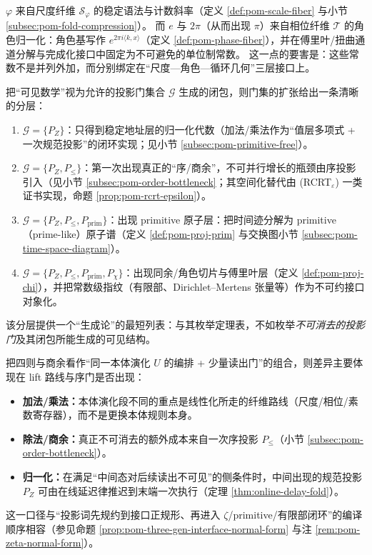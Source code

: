 \begin{remark}\label{rem:pom-constants-levels}
\(\varphi\) 来自尺度纤维 \(\mathcal S_\varphi\) 的稳定语法与计数斜率（定义 \ref{def:pom-scale-fiber} 与小节 \ref{subsec:pom-fold-compression}）。
而 \(e\) 与 \(2\pi\)（从而出现 \(\pi\)）来自相位纤维 \(\mathcal T\) 的角色归一化：角色基写作 \(e^{2\pi i\langle k,x\rangle}\)（定义 \ref{def:pom-phase-fiber}），并在傅里叶/扭曲通道分解与完成化接口中固定为不可避免的单位制常数。
这一点的要害是：这些常数不是并列外加，而分别绑定在“尺度—角色—循环几何”三层接口上。
\end{remark}

\begin{remark}\label{rem:pom-projection-gate-stratification}
把“可见数学”视为允许的投影门集合 \(\mathcal{G}\) 生成的闭包，则门集的扩张给出一条清晰的分层：
\begin{enumerate}
  \item \(\mathcal{G}=\{P_Z\}\)：只得到稳定地址层的归一化代数（加法/乘法作为“值层多项式 + 一次规范投影”的闭环实现；见小节 \ref{subsec:pom-primitive-free}）。
  \item \(\mathcal{G}=\{P_Z,P_{\le}\}\)：第一次出现真正的“序/商余”，不可并行增长的瓶颈由序投影引入（见小节 \ref{subsec:pom-order-bottleneck}；其空间化替代由 (RCRT\(_\varepsilon\)) 一类证书实现，命题 \ref{prop:pom-rcrt-epsilon}）。
  \item \(\mathcal{G}=\{P_Z,P_{\le},P_{\mathrm{prim}}\}\)：出现 primitive 原子层：把时间迹分解为 primitive（prime-like）原子谱（定义 \ref{def:pom-proj-prim} 与交换图小节 \ref{subsec:pom-time-space-diagram}）。
  \item \(\mathcal{G}=\{P_Z,P_{\le},P_{\mathrm{prim}},P_\chi\}\)：出现同余/角色切片与傅里叶层（定义 \ref{def:pom-proj-chi}），并把常数级指纹（有限部、Dirichlet--Mertens 张量等）作为不可约接口对象化。
\end{enumerate}
该分层提供一个“生成论”的最短列表：与其枚举定理表，不如枚举\emph{不可消去的投影门}及其闭包所能生成的可见结构。
\end{remark}

\begin{remark}\label{rem:pom-two-projection-normal-form}
把四则与商余看作“同一本体演化 \(U\) 的编排 + 少量读出门”的组合，则差异主要体现在 lift 路线与序门是否出现：
\begin{itemize}
  \item \textbf{加法/乘法：}本体演化段不同的重点是线性化所走的纤维路线（尺度/相位/素数寄存器），而不是更换本体规则本身。
  \item \textbf{除法/商余：}真正不可消去的额外成本来自一次序投影 \(P_{\le}\)（小节 \ref{subsec:pom-order-bottleneck}）。
  \item \textbf{归一化：}在满足“中间态对后续读出不可见”的侧条件时，中间出现的规范投影 \(P_Z\) 可由在线延迟律推迟到末端一次执行（定理 \ref{thm:online-delay-fold}）。
\end{itemize}
这一口径与“投影词先规约到接口正规形、再进入 \(\zeta\)/primitive/有限部闭环”的编译顺序相容（参见命题 \ref{prop:pom-three-gen-interface-normal-form} 与注 \ref{rem:pom-zeta-normal-form}）。
\end{remark}

